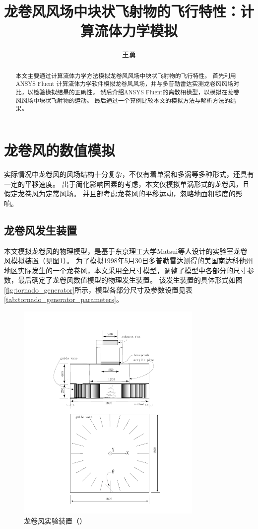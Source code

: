 \documentclass{ctexart}
\title{龙卷风风场中块状飞射物的飞行特性：计算流体力学模拟}
\author{王勇}
\begin{document}
\maketitle
\begin{abstract}
本文主要通过计算流体力学方法模拟龙卷风风场中块状飞射物的飞行特性。
首先利用ANSYS Fluent 计算流体力学软件模拟龙卷风风场，并与多普勒雷达实测龙卷风风场对比，以检验模拟结果的正确性。
然后介绍ANSYS Fluent的离散相模型，以模拟在龙卷风风场中块状飞射物的运动。
最后通过一个算例比较本文的模拟方法与解析方法的结果。
\end{abstract}

\section{龙卷风的数值模拟} \label{sec:tornado_simulation}
实际情况中龙卷风的风场结构十分复杂，不仅有着单涡和多涡等多种形式，还具有一定的平移速度。
出于简化影响因素的考虑，本文仅模拟单涡形式的龙卷风，且假定龙卷风为定常风场。
并且部考虑龙卷风的平移运动，忽略地面粗糙度的影响。

\subsection{龙卷风发生装置}
本文模拟龙卷风的物理模型，是基于东京理工大学Matsui等人\cite{matsui2009}设计的实验室龙卷风模拟装置（见图\ref{fig:matsui_tornado_generator}）。
为了模拟1998年5月30日多普勒雷达测得的美国南达科他州地区实际发生的一个龙卷风，本文采用全尺寸模型，调整了模型中各部分的尺寸参数，最后确定了龙卷风数值模型的物理发生装置\cite{tang2013}。
该发生装置的具体形式如图\ref{fig:tornado_generator}所示，模型各部分尺寸及参数设置见表\ref{tab:tornado_generator_parameters}。

\begin{figure}[h!]
\centering
\includegraphics[width=0.8\textwidth]{./fig/matsui_tornado_generator}
\caption{龙卷风实验装置（\cite{matsui2009}）}
\label{fig:matsui_tornado_generator}
\end{figure}
\end{document}
